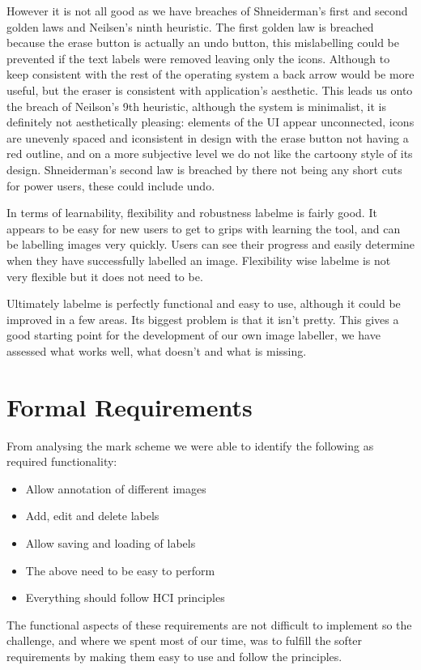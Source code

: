 \documentclass[a4paper,11pt,oneside]{article}
\begin{document}
However it is not all good as we have breaches of Shneiderman's first and
second golden laws and Neilsen's ninth heuristic.  The first golden law is
breached because the erase button is actually an undo button, this mislabelling
could be prevented if the text labels were removed leaving only the icons.  
Although to keep consistent with the rest of the operating system a back arrow 
would be more useful, but the eraser is consistent with application's aesthetic.  
This leads us onto the breach of Neilson's 9th heuristic, although the system 
is minimalist, it is definitely not aesthetically pleasing: elements of the UI 
appear unconnected, icons are unevenly spaced and iconsistent in design with 
the erase button not having a red outline, and on a more subjective level we 
do not like the cartoony style of its design.  Shneiderman's second law is 
breached by there not being any short cuts for power users, these could include 
undo.

In terms of learnability, flexibility and robustness labelme is fairly good. 
It appears to be easy for new users to get to grips with learning the tool, and
can be labelling images very quickly.  Users can see their progress and easily
determine when they have successfully labelled an image.  Flexibility wise
labelme is not very flexible but it does not need to be.

Ultimately labelme is perfectly functional and easy to use, although it could be
improved in a few areas.  Its biggest problem is that it isn't pretty.  This
gives a good starting point for the development of our own image labeller, we
have assessed what works well, what doesn't and what is missing.

\section{Formal Requirements}

From analysing the mark scheme we were able to identify the following as
required functionality:
\begin{itemize}
\item Allow annotation of different images
\item Add, edit and delete labels
\item Allow saving and loading of labels
\item The above need to be easy to perform
\item Everything should follow HCI principles
\end{itemize}
The functional aspects of these requirements are not difficult to implement so
the challenge, and where we spent most of our time, was to fulfill the softer
requirements by making them easy to use and follow the principles.
\end{document}
